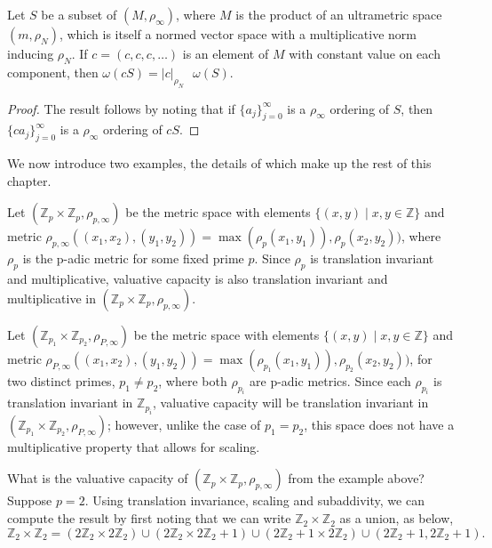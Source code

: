 \begin{corollary}
Let $S$ be a subset of $(M, \rho_\infty)$, where $M$ is the product of an ultrametric space $(m, \rho_N)$, which is itself a normed vector space with a multiplicative norm inducing $\rho_N$. If $c=(c,c,c,\ldots)$ is an element of $M$ with constant value on each component, then $\omega(cS)=\lvert c \rvert_{\rho_N} \text{ }\omega(S)$.
\end{corollary}

\begin{proof} 
The result follows by noting that if $\{a_j\}_{j=0}^\infty$ is a $\rho_\infty$ ordering of $S$, then $\{ca_j\}_{j=0}^\infty$ is a $\rho_\infty$ ordering of $cS$.
\end{proof}

We now introduce two examples, the details of which make up the rest of this chapter.\\ 

\begin{example}
	Let $(\mathbb{Z}_p \times \mathbb{Z}_p, \rho_{p,\infty})$ be the metric space with elements $\{(x,y)\mid x,y \in \mathbb{Z}\}$ and metric $\rho_{p,\infty}((x_1,x_2), (y_1,y_2)) = \max(\rho_p(x_1, y_1)), \rho_p(x_2, y_2))$, where $\rho_p$ is the p-adic metric for some fixed prime $p$. Since $\rho_p$ is translation invariant and multiplicative, valuative capacity is also translation invariant and multiplicative in  $(\mathbb{Z}_p \times \mathbb{Z}_p, \rho_{p,\infty})$.
\end{example}

\begin{example}
	Let $(\mathbb{Z}_{p_1} \times \mathbb{Z}_{p_2}, \rho_{P,\infty})$ be the metric space with elements $\{(x,y)\mid x,y \in \mathbb{Z}\}$ and metric $\rho_{P,\infty}((x_1,x_2), (y_1,y_2)) = \max(\rho_{p_1}(x_1, y_1)), \rho_{p_2}(x_2, y_2))$, for two distinct primes, $p_1 \neq p_2$, where both $\rho_{p_i}$ are p-adic metrics. Since each $\rho_{p_i}$ is translation invariant in $\mathbb{Z}_{p_i}$, valuative capacity will be translation invariant  in  $(\mathbb{Z}_{p_1} \times \mathbb{Z}_{p_2}, \rho_{P,\infty})$; however, unlike the case of $p_1=p_2$, this space does not have a multiplicative property that allows for scaling.
\end{example}

What is the valuative capacity of  $(\mathbb{Z}_p \times \mathbb{Z}_p, \rho_{p,\infty})$  from the example above? Suppose $p=2$.  Using translation invariance, scaling and subaddivity, we can compute the result by first noting that we can write $\mathbb{Z}_2 \times \mathbb{Z}_2$ as a union, as below,\\
\[
\mathbb{Z}_2 \times \mathbb{Z}_2 = (2\mathbb{Z}_2 \times 2\mathbb{Z}_2) \cup (2\mathbb{Z}_2 \times 2\mathbb{Z}_2 +1) \cup (2\mathbb{Z}_2+1 \times 2\mathbb{Z}_2) \cup (2\mathbb{Z}_2+1, 2\mathbb{Z}_2+1).
\]

